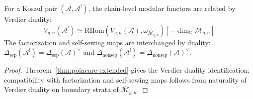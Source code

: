 \begin{corollary}\label{cor:dual-modular-functor}
For a Koszul pair $(\mathcal{A}, \mathcal{A}^!)$, the chain-level
modular functors are related by Verdier duality:
\begin{equation}\label{eq:dual-mf}
V_{g,n}(\mathcal{A}^!) \simeq
\mathrm{RHom}(V_{g,n}(\mathcal{A}),
\omega_{\overline{\mathcal{M}}_{g,n}})
[-\dim_{\mathbb{C}} \mathcal{M}_{g,n}]
\end{equation}
The factorization and self-sewing maps are interchanged by duality:
$\Delta_{\mathrm{sep}}(\mathcal{A}^!) = \Delta_{\mathrm{sep}}
(\mathcal{A})^\vee$ and $\Delta_{\mathrm{nonsep}}(\mathcal{A}^!)
= \Delta_{\mathrm{nonsep}}(\mathcal{A})^\vee$.
\end{corollary}

\begin{proof}
Theorem~\ref{thm:poincare-extended} gives the Verdier duality identification; compatibility with factorization and self-sewing maps follows from naturality of Verdier duality on boundary strata of $\overline{\mathcal{M}}_{g,n}$.
\end{proof}

